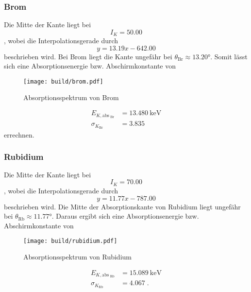 \subsubsection{Brom}
Die Mitte der Kante liegt bei 
\begin{equation*}
    I_K = 50.00
\end{equation*}
, wobei die Interpolationsgerade durch 
\begin{equation*}
    y = 13.19 x -642.00
\end{equation*}
beschrieben wird.
Bei Brom liegt die Kante ungefähr bei $\theta_\text{Br} \approx \ang{13.20;;}$. Somit lässt sich eine Absorptionsenergie bzw. Abschirmkonstante von 
\begin{figure}
    \centering
    \caption{Absorptionsspektrum von Brom}
    \label{fig:Brom}
    \texttt{[image: build/brom.pdf]}
\end{figure}
\begin{align*}
    E_{K, \text{abs}_\text{ Br}}  &= \SI{13.480}{\kilo\electronvolt} \\
    \sigma_{K_\text{Br}}                &= \num{3.835}
\end{align*}
errechnen.
\FloatBarrier
\subsubsection{Rubidium}
Die Mitte der Kante liegt bei 
\begin{equation*}
    I_K = 70.00
\end{equation*}
, wobei die Interpolationsgerade durch 
\begin{equation*}
    y = 11.77x - 787.00
\end{equation*}
beschrieben wird.
Die Mitte der Absorptionskante von Rubidium liegt ungefähr bei $\theta_\text{Rb} \approx \ang{11.77;;}$. Daraus ergibt sich eine Absorptionsenergie bzw. Abschirmkonstante von 
\begin{figure}
    \centering
    \caption{Absorptionsspektrum von Rubidium}
    \label{fig:Rubidium}
    \texttt{[image: build/rubidium.pdf]}
\end{figure}
\begin{align*}
    E_{K, \text{abs}_\text{ Rb}}  &= \SI{15.089}{\kilo\electronvolt} \\
    \sigma_{K_\text{Rb}}         &= \num{4.067} \; \text{.}
\end{align*}
\FloatBarrier
